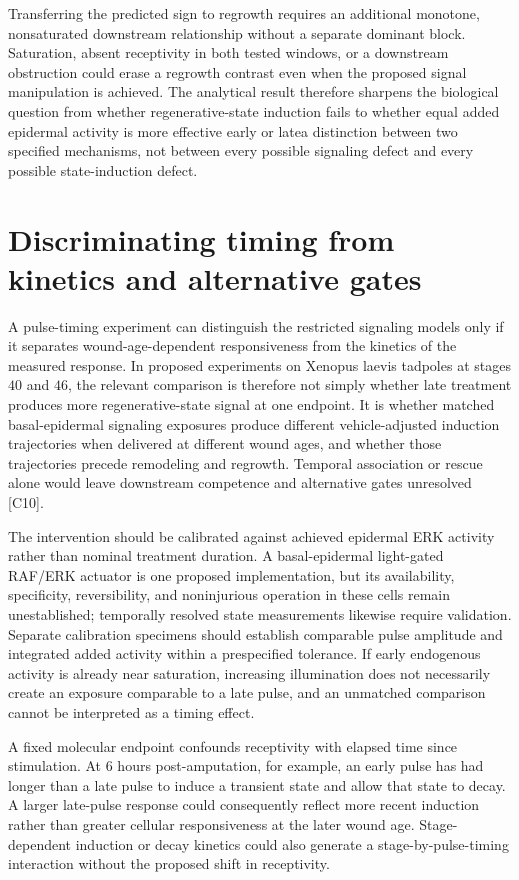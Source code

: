 \documentclass[11pt]{article}
\begin{document}
Transferring the predicted sign to regrowth requires an additional monotone, nonsaturated downstream relationship without a separate dominant block. Saturation, absent receptivity in both tested windows, or a downstream obstruction could erase a regrowth contrast even when the proposed signal manipulation is achieved. The analytical result therefore sharpens the biological question from whether regenerative-state induction fails to whether equal added epidermal activity is more effective early or late\textemdash{}a distinction between two specified mechanisms, not between every possible signaling defect and every possible state-induction defect.

\section{Discriminating timing from kinetics and alternative gates}
A pulse-timing experiment can distinguish the restricted signaling models only if it separates wound-age-dependent responsiveness from the kinetics of the measured response. In proposed experiments on Xenopus laevis tadpoles at stages $40$ and $46$, the relevant comparison is therefore not simply whether late treatment produces more regenerative-state signal at one endpoint. It is whether matched basal-epidermal signaling exposures produce different vehicle-adjusted induction trajectories when delivered at different wound ages, and whether those trajectories precede remodeling and regrowth. Temporal association or rescue alone would leave downstream competence and alternative gates unresolved [C10].

The intervention should be calibrated against achieved epidermal ERK activity rather than nominal treatment duration. A basal-epidermal light-gated RAF/ERK actuator is one proposed implementation, but its availability, specificity, reversibility, and noninjurious operation in these cells remain unestablished; temporally resolved state measurements likewise require validation. Separate calibration specimens should establish comparable pulse amplitude and integrated added activity within a prespecified tolerance. If early endogenous activity is already near saturation, increasing illumination does not necessarily create an exposure comparable to a late pulse, and an unmatched comparison cannot be interpreted as a timing effect.

A fixed molecular endpoint confounds receptivity with elapsed time since stimulation. At $6$ hours post-amputation, for example, an early pulse has had longer than a late pulse to induce a transient state and allow that state to decay. A larger late-pulse response could consequently reflect more recent induction rather than greater cellular responsiveness at the later wound age. Stage-dependent induction or decay kinetics could also generate a stage-by-pulse-timing interaction without the proposed shift in receptivity.
\end{document}
